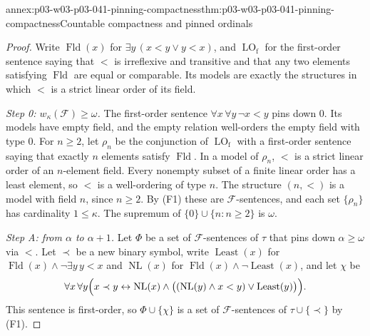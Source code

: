\begin{annexitem}{annex:p03-w03-p03-041-pinning-compactness}{thm:p03-w03-p03-041-pinning-compactness}{Countable compactness and pinned ordinals}
\begin{proof}
Write \(\operatorname{Fld}(x)\) for \(\exists y\,(x<y\lor y<x)\), and
\(\operatorname{LO}_{\mathrm f}\) for the first-order sentence saying
that \(<\) is irreflexive and transitive and that any two elements
satisfying \(\operatorname{Fld}\) are equal or comparable. Its models are
exactly the structures in which \(<\) is a strict linear order of its
field.

\emph{Step 0: \(w_\kappa(\mathcal F)\geq\omega\).} The first-order
sentence \(\forall x\,\forall y\,\neg x<y\) pins down \(0\). Its models
have empty field, and the empty relation well-orders the empty field with
type \(0\). For \(n\geq2\), let \(\rho_n\) be the conjunction of
\(\operatorname{LO}_{\mathrm f}\) with a first-order sentence saying that
exactly \(n\) elements satisfy \(\operatorname{Fld}\). In a model of
\(\rho_n\), \(<\) is a strict linear order of an \(n\)-element field.
Every nonempty subset of a finite linear order has a least element, so
\(<\) is a well-ordering of type \(n\). The structure \((n,<)\) is a model
with field \(n\), since \(n\geq2\). By (F1) these are
\(\mathcal F\)-sentences, and each set \(\{\rho_n\}\) has cardinality
\(1\leq\kappa\). The supremum of \(\{0\}\cup\{n:n\geq2\}\) is \(\omega\).

\emph{Step A: from \(\alpha\) to \(\alpha+1\).} Let \(\Phi\) be a set of
\(\mathcal F\)-sentences of \(\tau\) that pins down \(\alpha\geq\omega\)
via \(<\). Let \(\prec\) be a new binary symbol, write
\(\operatorname{Least}(x)\) for
\(\operatorname{Fld}(x)\land\neg\exists y\,y<x\) and
\(\operatorname{NL}(x)\) for
\(\operatorname{Fld}(x)\land\neg\operatorname{Least}(x)\), and let
\(\chi\) be
\[
 \forall x\,\forall y\Bigl(x\prec y\leftrightarrow
   \operatorname{NL}(x)\land\bigl((\operatorname{NL}(y)\land x<y)
   \lor\operatorname{Least}(y)\bigr)\Bigr).
\]
This sentence is first-order, so \(\Phi\cup\{\chi\}\) is a set of
\(\mathcal F\)-sentences of \(\tau\cup\{\prec\}\) by (F1).


\end{proof}
\end{annexitem}
